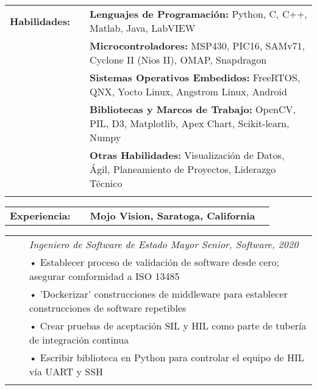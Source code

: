 \documentclass{minimal}
\begin{document}

\begin{center}
\fontsize{14}{12.8}\selectfont
\name\\
\fontsize{10}{12}\selectfont
\address\\
\phone\\
\email\\
\github\\
\end{center}
\vspace{0.5cm}

\begin{tabular}{ p{1.5cm} p{1cm} p{16cm} }
\textbf{Habilidades:} & & \textbf{Lenguajes de Programación:} Python, C, C++, Matlab, Java, LabVIEW\\
& & \textbf{Microcontroladores:} MSP430, PIC16, SAMv71, Cyclone II (Nios II), OMAP, Snapdragon\\
& & \textbf{Sistemas Operativos Embedidos:} FreeRTOS, QNX, Yocto Linux, Angstrom Linux, Android\\
& & \textbf{Bibliotecas y Marcos de Trabajo:} OpenCV, PIL, D3, Matplotlib, Apex Chart, Scikit-learn, Numpy\\
& & \textbf{Otras Habilidades:} Visualización de Datos, Ágil, Planeamiento de Proyectos, Liderazgo Técnico\\
& & \\
\end{tabular}

\begin{tabular}{ p{1.5cm} p{1cm} p{16cm} >{\raggedleft\arraybackslash}p{3cm} }
\textbf{Experiencia:} & & \textbf{Mojo Vision, Saratoga, California} & \\
\end{tabular}

\begin{tabular}{ p{1.5cm} p{1cm} p{16cm} }
& & \textit{Ingeniero de Software de Estado Mayor Senior, Software, 2020}\\
& & • Establecer proceso de validación de software desde cero; asegurar comformidad a ISO 13485\\
& & • 'Dockerizar' construcciones de middleware para establecer construcciones de software repetibles\\
& & • Crear pruebas de aceptación SIL y HIL como parte de tubería de integración continua\\
& & • Escribir biblioteca en Python para controlar el equipo de HIL vía UART y SSH\\
& & \\
\end{tabular}
\end{document}
